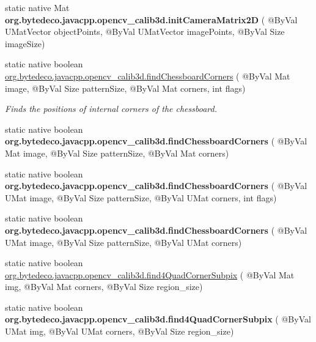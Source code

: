 \begin{DoxyCompactItemize}
\item 
\mbox{\label{group__calib3d_gac0cde900ba6d81d391059e245a4d6f02}} 
static native Mat {\bfseries org.\+bytedeco.\+javacpp.\+opencv\+\_\+calib3d.\+init\+Camera\+Matrix2D} ( @By\+Val U\+Mat\+Vector object\+Points, @By\+Val U\+Mat\+Vector image\+Points, @By\+Val Size image\+Size)
\item 
static native boolean \hyperlink{group__calib3d_ga8736b25349ec9178b46c38128bd9d95a}{org.\+bytedeco.\+javacpp.\+opencv\+\_\+calib3d.\+find\+Chessboard\+Corners} ( @By\+Val Mat image, @By\+Val Size pattern\+Size, @By\+Val Mat corners, int flags)
\begin{DoxyCompactList}\small\item\em Finds the positions of internal corners of the chessboard. \end{DoxyCompactList}\item 
\mbox{\label{group__calib3d_gaebdd3e703f88999b6bab14fa048d525c}} 
static native boolean {\bfseries org.\+bytedeco.\+javacpp.\+opencv\+\_\+calib3d.\+find\+Chessboard\+Corners} ( @By\+Val Mat image, @By\+Val Size pattern\+Size, @By\+Val Mat corners)
\item 
\mbox{\label{group__calib3d_ga2799ac5a09394f52db46167a8d8bf5db}} 
static native boolean {\bfseries org.\+bytedeco.\+javacpp.\+opencv\+\_\+calib3d.\+find\+Chessboard\+Corners} ( @By\+Val U\+Mat image, @By\+Val Size pattern\+Size, @By\+Val U\+Mat corners, int flags)
\item 
\mbox{\label{group__calib3d_gab705cbc992420a3529e6c1510dc0e12c}} 
static native boolean {\bfseries org.\+bytedeco.\+javacpp.\+opencv\+\_\+calib3d.\+find\+Chessboard\+Corners} ( @By\+Val U\+Mat image, @By\+Val Size pattern\+Size, @By\+Val U\+Mat corners)
\item 
static native boolean \hyperlink{group__calib3d_ga10b6a054de67db7ef3a290871688b660}{org.\+bytedeco.\+javacpp.\+opencv\+\_\+calib3d.\+find4\+Quad\+Corner\+Subpix} ( @By\+Val Mat img, @By\+Val Mat corners, @By\+Val Size region\+\_\+size)
\item 
\mbox{\label{group__calib3d_gace3abede4ceb179d4d7f0b954ff17f4a}} 
static native boolean {\bfseries org.\+bytedeco.\+javacpp.\+opencv\+\_\+calib3d.\+find4\+Quad\+Corner\+Subpix} ( @By\+Val U\+Mat img, @By\+Val U\+Mat corners, @By\+Val Size region\+\_\+size)

\end{DoxyCompactItemize}
